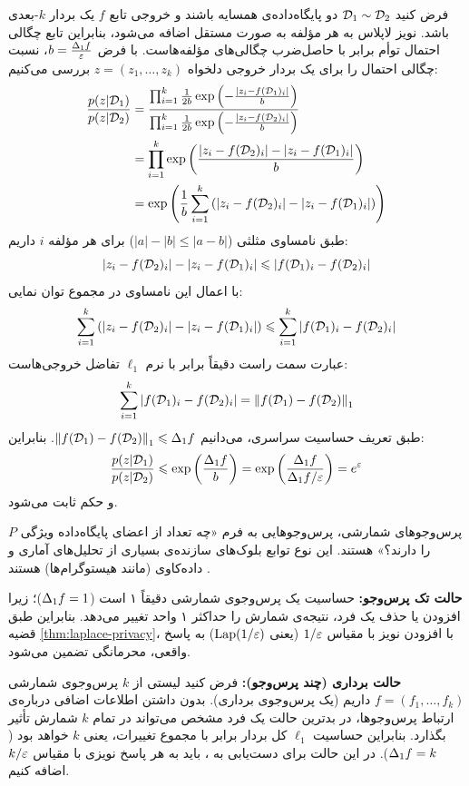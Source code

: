 \begin{اثبات}
فرض کنید $\Dset[1] \sim \Dset[2]$ دو پایگاه‌داده‌ی همسایه باشند و خروجی تابع $f$ یک بردار $k$-بعدی باشد. نویز لاپلاس به هر مؤلفه به صورت مستقل اضافه می‌شود، بنابراین تابع چگالی احتمال توأم برابر با حاصل‌ضرب چگالی‌های مؤلفه‌هاست.
با فرض $b = \frac{\Delta_1 f}{\varepsilon}$، نسبت چگالی احتمال را برای یک بردار خروجی دلخواه $z = (z_1, \dots, z_k)$ بررسی می‌کنیم:
\begin{align*}
\frac{p(z | \Dset[1])}{p(z | \Dset[2])} &= \frac{\prod_{i=1}^k \frac{1}{2b} \exp\left(-\frac{|z_i - f(\Dset[1])_i|}{b}\right)}{\prod_{i=1}^k \frac{1}{2b} \exp\left(-\frac{|z_i - f(\Dset[2])_i|}{b}\right)} \\
&= \prod_{i=1}^k \exp\left( \frac{|z_i - f(\Dset[2])_i| - |z_i - f(\Dset[1])_i|}{b} \right) \\
&= \exp\left( \frac{1}{b} \sum_{i=1}^k \left( |z_i - f(\Dset[2])_i| - |z_i - f(\Dset[1])_i| \right) \right)
\end{align*}
طبق نامساوی مثلثی ($|a| - |b| \le |a-b|$) برای هر مؤلفه $i$ داریم:
\[
|z_i - f(\Dset[2])_i| - |z_i - f(\Dset[1])_i| \le |f(\Dset[1])_i - f(\Dset[2])_i|
\]
با اعمال این نامساوی در مجموع توان نمایی:
\[
\sum_{i=1}^k \left( |z_i - f(\Dset[2])_i| - |z_i - f(\Dset[1])_i| \right) \le \sum_{i=1}^k |f(\Dset[1])_i - f(\Dset[2])_i|
\]
عبارت سمت راست دقیقاً برابر با نرم $\ell_1$ تفاضل خروجی‌هاست:
\[
\sum_{i=1}^k |f(\Dset[1])_i - f(\Dset[2])_i| = \left\| f(\Dset[1]) - f(\Dset[2]) \right\|_1
\]
طبق تعریف حساسیت سراسری، می‌دانیم $\left\| f(\Dset[1]) - f(\Dset[2]) \right\|_1 \le \Del_1 f$. بنابراین:
\[
\frac{p(z | \Dset[1])}{p(z | \Dset[2])} \le \exp\left( \frac{\Del_1 f}{b} \right) = \exp\left( \frac{\Del_1 f}{\Del_1 f / \eps} \right) = e^\eps
\]
و حکم ثابت می‌شود.
\end{اثبات}

\begin{مثال}
\label{ex:counting-queries}
پرس‌وجوهای شمارشی، پرس‌وجوهایی به فرم «چه تعداد از اعضای پایگاه‌داده ویژگی $P$ را دارند؟» هستند. این نوع توابع بلوک‌های سازنده‌ی بسیاری از تحلیل‌های آماری و داده‌کاوی (مانند هیستوگرام‌ها) هستند \cite{dwork2014roth}.

\textbf{حالت تک پرس‌وجو:}
حساسیت یک پرس‌وجوی شمارشی دقیقاً ۱ است ($\Delta_1 f = 1$)؛ زیرا افزودن یا حذف یک فرد، نتیجه‌ی شمارش را حداکثر ۱ واحد تغییر می‌دهد. بنابراین طبق قضیه \ref{thm:laplace-privacy}، با افزودن نویز با مقیاس $1/\varepsilon$ (یعنی $\mathrm{Lap}(1/\varepsilon)$) به پاسخ واقعی، محرمانگی \DP[(\eps, 0)] تضمین می‌شود.

\textbf{حالت برداری (چند پرس‌وجو):}
فرض کنید لیستی از $k$ پرس‌وجوی شمارشی $f = (f_1, \dots, f_k)$ داریم (یک پرس‌وجوی برداری). بدون داشتن اطلاعات اضافی درباره‌ی ارتباط پرس‌وجوها، در بدترین حالت یک فرد مشخص می‌تواند در تمام $k$ شمارش تأثیر بگذارد. بنابراین حساسیت $\ell_1$ کل بردار برابر با مجموع تغییرات، یعنی $k$ خواهد بود ($\Delta_1 f = k$).
در این حالت برای دست‌یابی به \DP، باید به هر پاسخ نویزی با مقیاس $k/\varepsilon$ اضافه کنیم.
\end{مثال}

